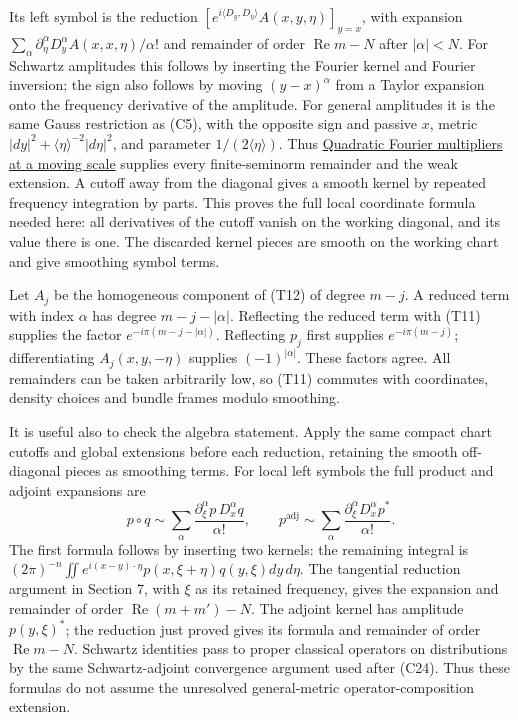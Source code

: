 \documentclass[
  11pt,
]{article}
\begin{document}
Its left symbol is the reduction
\([ e^{i\langle D_y,D_\eta\rangle}A(x,y,\eta)]_{y=x}\), with expansion
\(\sum_\alpha\partial_\eta^\alpha D_y^\alpha A(x,x,\eta)/\alpha!\) and
remainder of order \(\operatorname{Re}m-N\) after \(|\alpha|<N\). For
Schwartz amplitudes this follows by inserting the Fourier kernel and
Fourier inversion; the sign also follows by moving \((y-x)^\alpha\) from
a Taylor expansion onto the frequency derivative of the amplitude. For
general amplitudes it is the same Gauss restriction as (C5), with the
opposite sign and passive \(x\), metric
\(|dy|^2+\langle\eta\rangle^{-2}|d\eta|^2\), and parameter
\(1/(2\langle\eta\rangle)\). Thus
\href{gauss-transform-estimates.pdf}{Quadratic Fourier multipliers at a
moving scale} supplies every finite-seminorm remainder and the weak
extension. A cutoff away from the diagonal gives a smooth kernel by
repeated frequency integration by parts. This proves the full local
coordinate formula needed here: all derivatives of the cutoff vanish on
the working diagonal, and its value there is one. The discarded kernel
pieces are smooth on the working chart and give smoothing symbol terms.

Let \(A_j\) be the homogeneous component of (T12) of degree \(m-j\). A
reduced term with index \(\alpha\) has degree \(m-j-|\alpha|\).
Reflecting the reduced term with (T11) supplies the factor
\(e^{-i\pi(m-j-|\alpha|)}\). Reflecting \(p_j\) first supplies
\(e^{-i\pi(m-j)}\); differentiating \(A_j(x,y,-\eta)\) supplies
\((-1)^{|\alpha|}\). These factors agree. All remainders can be taken
arbitrarily low, so (T11) commutes with coordinates, density choices and
bundle frames modulo smoothing.

It is useful also to check the algebra statement. Apply the same compact
chart cutoffs and global extensions before each reduction, retaining the
smooth off-diagonal pieces as smoothing terms. For local left symbols
the full product and adjoint expansions are \[
p\circ q\sim\sum_\alpha\frac{\partial_\xi^\alpha p\,D_x^\alpha q}{\alpha!},
\qquad
p^{\mathrm{adj}}\sim\sum_\alpha
\frac{\partial_\xi^\alpha D_x^\alpha p^*}{\alpha!}.
\tag{T13}
\] The first formula follows by inserting two kernels: the remaining
integral is
\((2\pi)^{-n}\iint e^{i(x-y)\cdot\eta}p(x,\xi+\eta)q(y,\xi)dy\,d\eta\).
The tangential reduction argument in Section 7, with \(\xi\) as its
retained frequency, gives the expansion and remainder of order
\(\operatorname{Re}(m+m')-N\). The adjoint kernel has amplitude
\(p(y,\xi)^*\); the reduction just proved gives its formula and
remainder of order \(\operatorname{Re}m-N\). Schwartz identities pass to
proper classical operators on distributions by the same Schwartz-adjoint
convergence argument used after (C24). Thus these formulas do not assume
the unresolved general-metric operator-composition extension.
\end{document}
